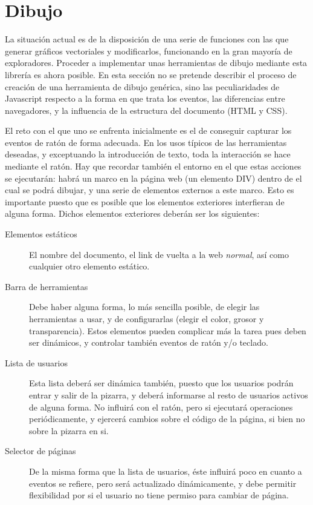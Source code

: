 \section{Dibujo} %
\label{sec:javascript_dibujo}
La situación actual es de la disposición de una serie de funciones con las que generar gráficos vectoriales y modificarlos, funcionando en la gran mayoría de exploradores. Proceder a implementar unas herramientas de dibujo mediante esta librería es ahora posible. En esta sección no se pretende describir el proceso de creación de una herramienta de dibujo genérica, sino las peculiaridades de Javascript respecto a la forma en que trata los eventos, las diferencias entre navegadores, y la influencia de la estructura del documento (HTML y CSS).

El reto con el que uno se enfrenta inicialmente es el de conseguir capturar los eventos de ratón de forma adecuada. En los usos típicos de las herramientas deseadas, y exceptuando la introducción de texto, toda la interacción se hace mediante el ratón. Hay que recordar también el entorno en el que estas acciones se ejecutarán: habrá un marco en la página web (un elemento DIV) dentro de el cual se podrá dibujar, y una serie de elementos externos a este marco. Esto es importante puesto que es posible que los elementos exteriores interfieran de alguna forma. Dichos elementos exteriores deberán ser los siguientes:

\begin{description}
  \item[Elementos estáticos] El nombre del documento, el link de vuelta a la web \emph{normal}, así como cualquier otro elemento estático.
  \item[Barra de herramientas] Debe haber alguna forma, lo más sencilla posible, de elegir las herramientas a usar, y de configurarlas (elegir el color, grosor y transparencia). Estos elementos pueden complicar más la tarea pues deben ser dinámicos, y controlar también eventos de ratón y/o teclado.
  \item[Lista de usuarios] Esta lista deberá ser dinámica también, puesto que los usuarios podrán entrar y salir de la pizarra, y deberá informarse al resto de usuarios activos de alguna forma. No influirá con el ratón, pero si ejecutará operaciones periódicamente, y ejercerá cambios sobre el código de la página, si bien no sobre la pizarra en si.  
  \item[Selector de páginas] De la misma forma que la lista de usuarios, éste influirá poco en cuanto a eventos se refiere, pero será actualizado dinámicamente, y debe permitir flexibilidad por si el usuario no tiene permiso para cambiar de página.
\end{description}

